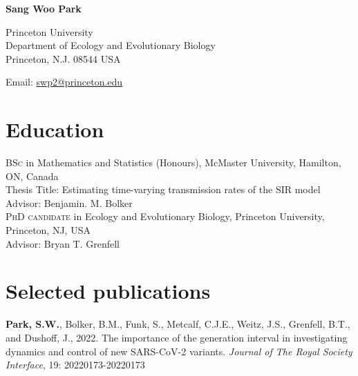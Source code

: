 \documentclass[11pt]{article} %
\begin{document}

{\LARGE\bfseries Sang Woo Park} %
\bigskip\bigskip\medskip %

Princeton University\\ %
Department of Ecology and Evolutionary Biology\\
Princeton, N.J. 08544 USA
\medskip %

Email: \href{mailto:swp2@princeton.edu}{swp2@princeton.edu}\\ %


\section*{Education}

\textsc{BSc} in Mathematics and Statistics (Honours), McMaster University, Hamilton, ON, Canada\\
Thesis Title: Estimating time-varying transmission rates of the SIR model\\
Advisor: Benjamin. M. Bolker\\

\textsc{PhD candidate} in Ecology and Evolutionary Biology, Princeton University, Princeton, NJ, USA\\
Advisor: Bryan T. Grenfell


\section*{Selected publications}

 \textbf{Park, S.W.}, Bolker, B.M., Funk, S., Metcalf, C.J.E., Weitz, J.S., Grenfell, B.T., and Dushoff, J., 2022. The importance of the generation interval in investigating dynamics and control of new SARS-CoV-2 variants. \textit{Journal of The Royal Society Interface}, 19: 20220173-20220173\\
\end{document}
